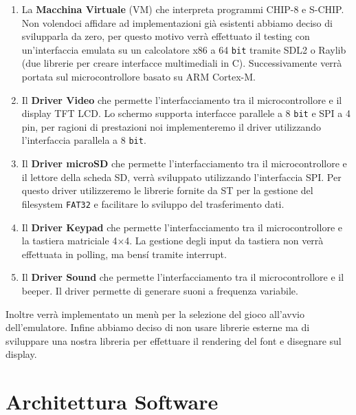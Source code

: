 \documentclass[a4paper]{article}
\begin{document}
\begin{enumerate}
	\item La \textbf{Macchina Virtuale} (VM) che interpreta programmi CHIP-8 e S-CHIP. Non volendoci affidare ad implementazioni già esistenti abbiamo deciso di svilupparla da zero, per questo motivo verrà effettuato il testing con un'interfaccia emulata su un calcolatore \textrm{x}86 a 64 \texttt{bit} tramite SDL2 o Raylib (due librerie per creare interfacce multimediali in C). Successivamente verrà portata sul microcontrollore basato su ARM Cortex-M.
	\item Il \textbf{Driver Video} che permette l'interfacciamento tra il microcontrollore e il display TFT LCD. Lo schermo supporta interfacce parallele a 8 \texttt{bit} e SPI a 4 pin, per ragioni di prestazioni noi implementeremo il driver utilizzando l'interfaccia parallela a 8 \texttt{bit}.
	\item Il \textbf{Driver microSD} che permette l'interfacciamento tra il microcontrollore e il lettore della scheda SD, verrà sviluppato utilizzando l'interfaccia SPI. Per questo driver utilizzeremo le librerie fornite da ST per la gestione del filesystem \texttt{FAT32} e facilitare lo sviluppo del trasferimento dati.
	\item Il \textbf{Driver Keypad} che permette l'interfacciamento tra il microcontrollore e la tastiera matriciale 4$\times$4. La gestione degli input da tastiera non verrà effettuata in polling, ma bens\'{i} tramite interrupt.
	\item Il \textbf{Driver Sound} che permette l'interfacciamento tra il microcontrollore e il beeper. Il driver permette di generare suoni a frequenza variabile.
\end{enumerate}

Inoltre verrà implementato un menù per la selezione del gioco all'avvio dell'emulatore. Infine abbiamo deciso di non usare librerie esterne ma di sviluppare una nostra libreria per effettuare il rendering del font e disegnare sul display.

\section{Architettura Software}
\end{document}

